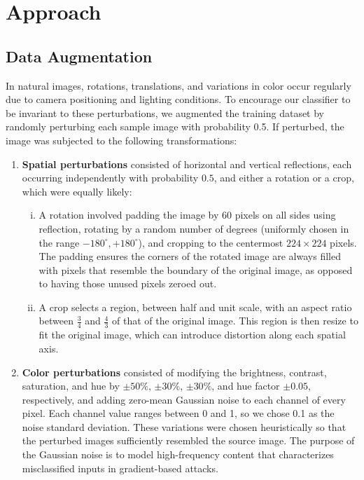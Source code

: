 \documentclass[justified]{article}
\begin{document}
  \section{Approach}

  \subsection{Data Augmentation}

  In natural images, rotations, translations, and variations in color occur regularly due to camera positioning and lighting conditions.
  To encourage our classifier to be invariant to these perturbations, we augmented the training dataset by randomly perturbing each sample image with probability 0.5. If perturbed, the image was subjected to the following transformations:
  \begin{enumerate}
  \item
    \textbf{Spatial perturbations} consisted of horizontal and vertical reflections, each occurring independently with probability $0.5$, and either a rotation or a crop, which were equally likely:
    \begin{enumerate}[(i)]
    \item
      A rotation involved padding the image by 60 pixels on all sides using reflection, rotating by a random number of degrees (uniformly chosen in the range $-180^\circ, +180^\circ$), and cropping to the centermost $224 \times 224$ pixels.
      The padding ensures the corners of the rotated image are always filled with pixels that resemble the boundary of the original image, as opposed to having those unused pixels zeroed out.

    \item
      A crop selects a region, between half and unit scale, with an aspect ratio between $\frac{3}{4}$ and $\frac{4}{3}$ of that of the original image.
      This region is then resize to fit the original image, which can introduce distortion along each spatial axis.
    \end{enumerate}

  \item
    \textbf{Color perturbations} consisted of modifying the brightness, contrast, saturation, and hue by $\pm 50\%$, $\pm 30\%$, $\pm 30\%$, and hue factor $\pm 0.05$, respectively, and adding zero-mean Gaussian noise to each channel of every pixel.
    Each channel value ranges between 0 and 1, so we chose 0.1 as the noise standard deviation.
    These variations were chosen heuristically so that the perturbed images sufficiently resembled the source image.
    The purpose of the Gaussian noise is to model high-frequency content that characterizes misclassified inputs in gradient-based attacks.
  \end{enumerate}
\end{document}
